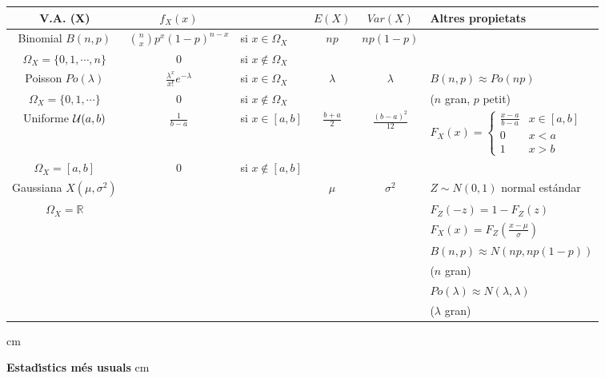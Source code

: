 \documentclass[a4paper,10pt]{article}
\begin{document}
{\begin{tabular}{|c|cl|c|c|l|}
V.A. (X) & $f_X(x)$ & & $E(X)$ & $Var(X)$ & Altres propietats \\
\hline
Binomial $B(n, p)$ & $\binom{n}{x} p^x (1-p)^{n-x}$ & si $x\in \Omega_X$ &
 $np$ & $np(1-p)$ & \\
$\Omega_X=\{ 0, 1, \cdots, n \}$ & $0$ & si $x \notin \Omega_X$ & & & \\ \hline
Poisson $Po(\lambda)$ & $\frac{\lambda^x}{x!} e^{-\lambda}$ & si $x\in \Omega_X$ & 
 $\lambda$ & $\lambda$ & $B(n, p) \approx Po(np)$ \\
$\Omega_X=\{ 0, 1, \cdots \}$ & $0$ & si $x \notin \Omega_X$ & & & ($n$ gran, $p$ petit)\\ \hline
Uniforme ${\cal U}(a, b)$ & $\frac{1}{b-a}$ & si $x \in [a, b]$ & 
$\frac{b+a}{2}$ & $\frac{(b-a)^2}{12}$ & 
$F_X(x)=\begin{cases} 
\frac{x-a}{b-a} & x \in [a, b] \\
0 & x < a \\
1 & x > b
\end{cases}$ \\
$\Omega_X=[a, b]$ & 0 & si $x \notin [a, b]$ &  & & \\ \hline
Gaussiana $X(\mu, \sigma^2)$ & & & $\mu$ & $\sigma^2$ & $Z\sim N(0, 1)$ normal est\'andar \\
$\Omega_X=\mathbb{R}$ & & & &  & $F_Z(-z)=1-F_Z(z)$ \\
 & & & &  & $F_X(x)=F_Z(\frac{x-\mu}{\sigma})$ \\ 
 & & & &  & $B(n, p) \approx N(np, np(1-p))$ \\ 
 & & & &  & ($n$ gran) \\
 & & & &  & $Po(\lambda) \approx N(\lambda, \lambda)$ \\ 
 & & & &  & ($\lambda$ gran) \\ \hline
\end{tabular}

 cm

\textbf{Estad\'\i stics m\'es usuals}
 cm

}
\end{document}
